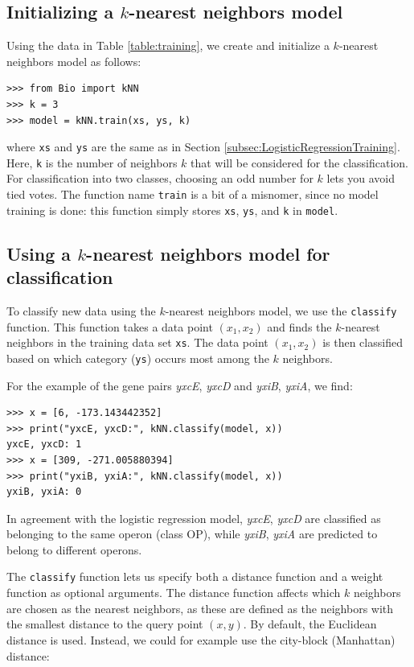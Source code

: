 \documentclass{report}
\begin{document}
\subsection{Initializing a $k$-nearest neighbors model}

Using the data in Table \ref{table:training}, we create and initialize a $k$-nearest neighbors model as follows:

\begin{verbatim}
>>> from Bio import kNN
>>> k = 3
>>> model = kNN.train(xs, ys, k)
\end{verbatim}

where \verb+xs+ and \verb+ys+ are the same as in Section \ref{subsec:LogisticRegressionTraining}. Here, \verb+k+ is the number of neighbors $k$ that will be considered for the classification. For classification into two classes, choosing an odd number for $k$ lets you avoid tied votes. The function name \verb+train+ is a bit of a misnomer, since no model training is done: this function simply stores \verb+xs+, \verb+ys+, and \verb+k+ in \verb+model+.

\subsection{Using a $k$-nearest neighbors model for classification}

To classify new data using the $k$-nearest neighbors model, we use the \verb+classify+ function. This function takes a data point $(x_1,x_2)$ and finds the $k$-nearest neighbors in the training data set \verb+xs+. The data point $(x_1, x_2)$ is then classified based on which category (\verb+ys+) occurs most among the $k$ neighbors.

For the example of the gene pairs {\it yxcE}, {\it yxcD} and {\it yxiB}, {\it yxiA}, we find:
\begin{verbatim}
>>> x = [6, -173.143442352]
>>> print("yxcE, yxcD:", kNN.classify(model, x))
yxcE, yxcD: 1
>>> x = [309, -271.005880394]
>>> print("yxiB, yxiA:", kNN.classify(model, x))
yxiB, yxiA: 0
\end{verbatim}
In agreement with the logistic regression model, {\it yxcE}, {\it yxcD} are classified as belonging to the same operon (class OP), while {\it yxiB}, {\it yxiA} are predicted to belong to different operons.

The \verb+classify+ function lets us specify both a distance function and a weight function as optional arguments. The distance function affects which $k$ neighbors are chosen as the nearest neighbors, as these are defined as the neighbors with the smallest distance to the query point $(x, y)$. By default, the Euclidean distance is used. Instead, we could for example use the city-block (Manhattan) distance:
\end{document}
